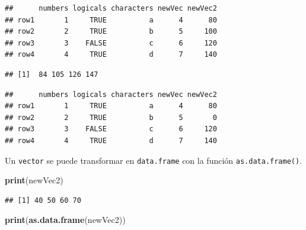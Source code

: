 \documentclass[]{book}
\newenvironment{Shaded}{\begin{snugshade}}{\end{snugshade}}
\newcommand{\KeywordTok}[1]{\textcolor[rgb]{0.13,0.29,0.53}{\textbf{#1}}}
\newcommand{\DecValTok}[1]{\textcolor[rgb]{0.00,0.00,0.81}{#1}}
\newcommand{\StringTok}[1]{\textcolor[rgb]{0.31,0.60,0.02}{#1}}
\newcommand{\OperatorTok}[1]{\textcolor[rgb]{0.81,0.36,0.00}{\textbf{#1}}}
\newcommand{\NormalTok}[1]{#1}
\begin{document}
\begin{verbatim}
##      numbers logicals characters newVec newVec2
## row1       1     TRUE          a      4      80
## row2       2     TRUE          b      5     100
## row3       3    FALSE          c      6     120
## row4       4     TRUE          d      7     140
\end{verbatim}

\begin{Shaded}
\end{Shaded}

\begin{verbatim}
## [1]  84 105 126 147
\end{verbatim}

\begin{Shaded}
\end{Shaded}

\begin{verbatim}
##      numbers logicals characters newVec newVec2
## row1       1     TRUE          a      4      80
## row2       2     TRUE          b      5       0
## row3       3    FALSE          c      6     120
## row4       4     TRUE          d      7     140
\end{verbatim}

Un \texttt{vector} se puede transformar en \texttt{data.frame} con la
función \texttt{as.data.frame()}.

\begin{Shaded}
\begin{Highlighting}[]
\KeywordTok{print}\NormalTok{(newVec2)}
\end{Highlighting}
\end{Shaded}

\begin{verbatim}
## [1] 40 50 60 70
\end{verbatim}

\begin{Shaded}
\begin{Highlighting}[]
\KeywordTok{print}\NormalTok{(}\KeywordTok{as.data.frame}\NormalTok{(newVec2))}
\end{Highlighting}
\end{Shaded}
\end{document}
